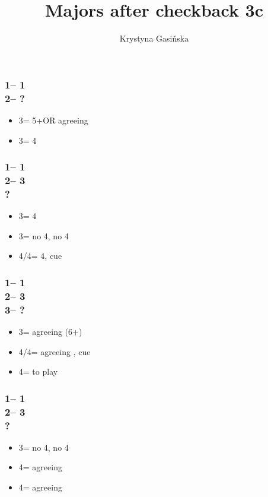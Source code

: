 \documentclass[12pt, a4paper]{article}
\title{Majors after checkback 3c}
\author{Krystyna Gasińska}
\begin{document}
\maketitle


\subsubsection*{1\minor -- 1\hearts \\ 2\nt -- ?}
\begin{itemize}
    \item 3\hearts = 5+\spades OR agreeing \hearts
    \item 3\spades = 4\spades
\end{itemize}

\subsubsection*{1\minor -- 1\hearts \\ 2\nt -- 3\hearts \\ ?}
\begin{itemize}
    \item 3\spades  = 4\spades
    \item 3\nt = no 4\spades, no 4\hearts
    \item 4\clubs/4\diams = 4\hearts, cue
\end{itemize}

\subsubsection*{1\minor -- 1\hearts \\ 2\nt -- 3\hearts \\ 3\spades -- ?}
\begin{itemize}
    \item 3\nt = agreeing \hearts (6+)
    \item 4\clubs/4\diams = agreeing \spades, cue
    \item 4\hearts = to play
\end{itemize}

\subsubsection*{1\minor -- 1\hearts \\ 2\nt -- 3\spades \\ ?}
\begin{itemize}
    \item 3\nt = no 4\spades, no 4\hearts
    \item 4\clubs = agreeing \hearts
    \item 4\diams = agreeing \spades
\end{itemize}

\end{document}
